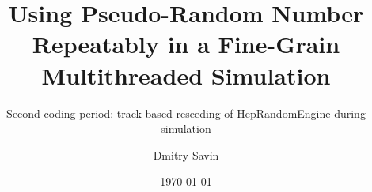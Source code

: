 \documentclass[aspectratio=169, 14pt]{beamer}
\title{Using Pseudo-Random Number Repeatably in a Fine-Grain Multithreaded Simulation}
\subtitle{Second coding period: track-based reseeding of HepRandomEngine during simulation}
\author{Dmitry Savin}
\date{\today}
\begin{document}
\begin{large}

 \frame{\titlepage}



 \end{large}
\end{document}
